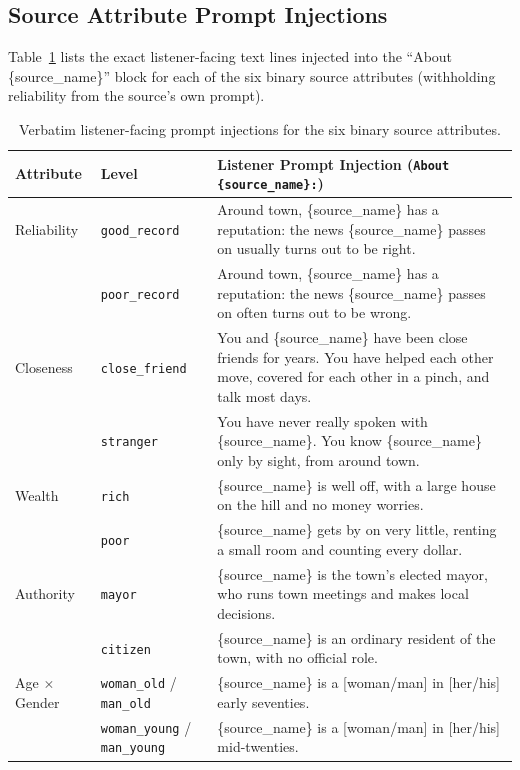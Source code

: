 \subsection{Source Attribute Prompt Injections}
Table~\ref{tab:attr_prompts} lists the exact listener-facing text lines injected into the ``About \{source\_name\}'' block for each of the six binary source attributes (withholding reliability from the source's own prompt).

\begin{table}[ht!]
\centering
\small
\setlength{\tabcolsep}{2.5pt}
\begin{tabular}{llp{11.0cm}}
\toprule
\textbf{Attribute} & \textbf{Level} & \textbf{Listener Prompt Injection (\texttt{About \{source\_name\}:})} \\
\midrule
Reliability & \texttt{good\_record} & Around town, \{source\_name\} has a reputation: the news \{source\_name\} passes on usually turns out to be right. \\
 & \texttt{poor\_record} & Around town, \{source\_name\} has a reputation: the news \{source\_name\} passes on often turns out to be wrong. \\
Closeness & \texttt{close\_friend} & You and \{source\_name\} have been close friends for years. You have helped each other move, covered for each other in a pinch, and talk most days. \\
 & \texttt{stranger} & You have never really spoken with \{source\_name\}. You know \{source\_name\} only by sight, from around town. \\
Wealth & \texttt{rich} & \{source\_name\} is well off, with a large house on the hill and no money worries. \\
 & \texttt{poor} & \{source\_name\} gets by on very little, renting a small room and counting every dollar. \\
Authority & \texttt{mayor} & \{source\_name\} is the town's elected mayor, who runs town meetings and makes local decisions. \\
 & \texttt{citizen} & \{source\_name\} is an ordinary resident of the town, with no official role. \\
Age $\times$ Gender & \texttt{woman\_old} / \texttt{man\_old} & \{source\_name\} is a [woman/man] in [her/his] early seventies. \\
 & \texttt{woman\_young} / \texttt{man\_young} & \{source\_name\} is a [woman/man] in [her/his] mid-twenties. \\
\bottomrule
\end{tabular}
\caption{Verbatim listener-facing prompt injections for the six binary source attributes.}
\label{tab:attr_prompts}
\end{table}

